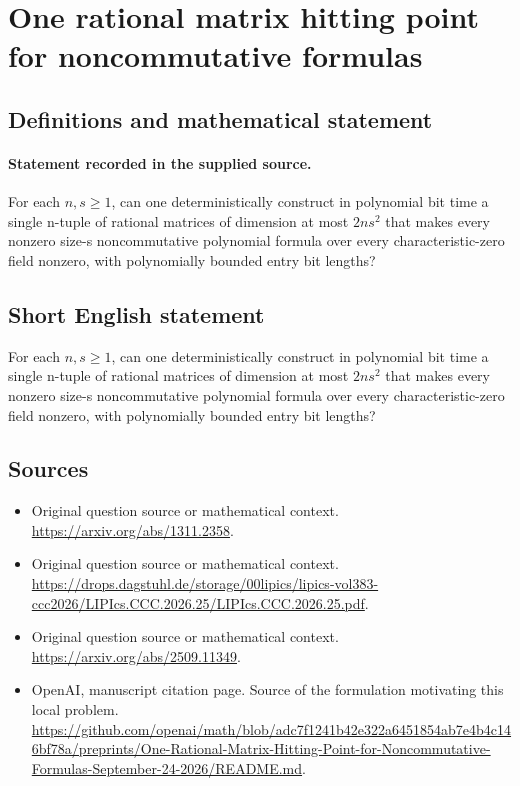 \documentclass[11pt]{article}
\begin{document}
\section*{One rational matrix hitting point for noncommutative formulas}\label{30007482}
\subsection{Definitions and mathematical statement}
\paragraph{Statement recorded in the supplied source.}
For each $n,s\geq 1$, can one deterministically construct in polynomial bit time a single n-tuple of rational matrices of dimension at most $2ns^{2}$ that makes every nonzero size-s noncommutative polynomial formula over every characteristic-zero field nonzero, with polynomially bounded entry bit lengths?
\subsection{Short English statement}
For each $n,s\geq 1$, can one deterministically construct in polynomial bit time a single n-tuple of rational matrices of dimension at most $2ns^{2}$ that makes every nonzero size-s noncommutative polynomial formula over every characteristic-zero field nonzero, with polynomially bounded entry bit lengths?
\subsection{Sources}
\begin{itemize}
\item[S1] Original question source or mathematical context.
\url{https://arxiv.org/abs/1311.2358}.
\item[S2] Original question source or mathematical context.
\url{https://drops.dagstuhl.de/storage/00lipics/lipics-vol383-ccc2026/LIPIcs.CCC.2026.25/LIPIcs.CCC.2026.25.pdf}.
\item[S3] Original question source or mathematical context.
\url{https://arxiv.org/abs/2509.11349}.
\item[S4] OpenAI, manuscript citation page. Source of the formulation motivating this local problem.
\url{https://github.com/openai/math/blob/adc7f1241b42e322a6451854ab7e4b4c146bf78a/preprints/One-Rational-Matrix-Hitting-Point-for-Noncommutative-Formulas-September-24-2026/README.md}.
\end{itemize}
\end{document}
